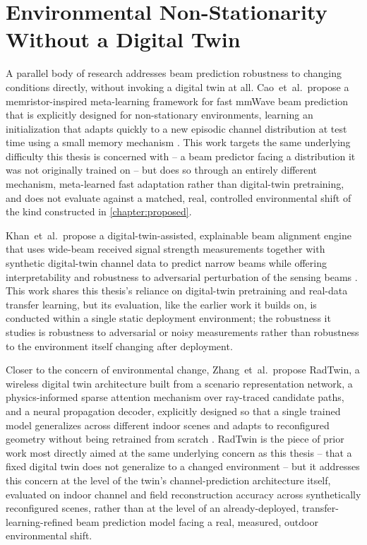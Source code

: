 \documentclass{iutbscthesis}
\begin{document}
\section{Environmental Non-Stationarity Without a Digital Twin}

A parallel body of research addresses beam prediction robustness to changing conditions directly, without invoking a digital twin at all. Cao~et~al.\ propose a memristor-inspired meta-learning framework for fast mmWave beam prediction that is explicitly designed for non-stationary environments, learning an initialization that adapts quickly to a new episodic channel distribution at test time using a small memory mechanism \cite{cao2025memristor}. This work targets the same underlying difficulty this thesis is concerned with -- a beam predictor facing a distribution it was not originally trained on -- but does so through an entirely different mechanism, meta-learned fast adaptation rather than digital-twin pretraining, and does not evaluate against a matched, real, controlled environmental shift of the kind constructed in \autoref{chapter:proposed}.

Khan~et~al.\ propose a digital-twin-assisted, explainable beam alignment engine that uses wide-beam received signal strength measurements together with synthetic digital-twin channel data to predict narrow beams while offering interpretability and robustness to adversarial perturbation of the sensing beams \cite{khan2025dtxai}. This work shares this thesis's reliance on digital-twin pretraining and real-data transfer learning, but its evaluation, like the earlier work it builds on, is conducted within a single static deployment environment; the robustness it studies is robustness to adversarial or noisy measurements rather than robustness to the environment itself changing after deployment.

Closer to the concern of environmental change, Zhang~et~al.\ propose RadTwin, a wireless digital twin architecture built from a scenario representation network, a physics-informed sparse attention mechanism over ray-traced candidate paths, and a neural propagation decoder, explicitly designed so that a single trained model generalizes across different indoor scenes and adapts to reconfigured geometry without being retrained from scratch \cite{zhang2026radtwin}. RadTwin is the piece of prior work most directly aimed at the same underlying concern as this thesis -- that a fixed digital twin does not generalize to a changed environment -- but it addresses this concern at the level of the twin's channel-prediction architecture itself, evaluated on indoor channel and field reconstruction accuracy across synthetically reconfigured scenes, rather than at the level of an already-deployed, transfer-learning-refined beam prediction model facing a real, measured, outdoor environmental shift.
\end{document}
